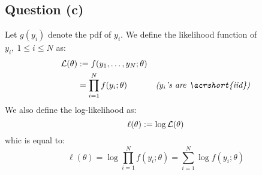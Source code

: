 \documentclass[12pt]{article}
\begin{document}
\subsection{Question (c)}
Let \(g(y_i)\) denote the \gls{pdf} of \(y_i\). We define the likelihood function of \(y_i, \ 1 \leq i \leq N\) as:
\begin{align*}
    \L(\theta)
     & := f(y_1, \ldots, y_N ; \theta)                                           \\
     & = \prod_{i=1}^N f(y_i ; \theta) & \textit{(\(y_i\)'s are \acrshort{iid})} \\
\end{align*}
We also define the log-likelihood as:
\begin{equation*}
    \ell(\theta) := \log \mathcal{L}(\theta)
\end{equation*}
whic is equal to:
\begin{equation*}
    \ell(\theta) = \log \prod_{i=1}^N f(y_i ; \theta) = \sum_{i=1}^N \log f(y_i ; \theta)
\end{equation*}
\end{document}
